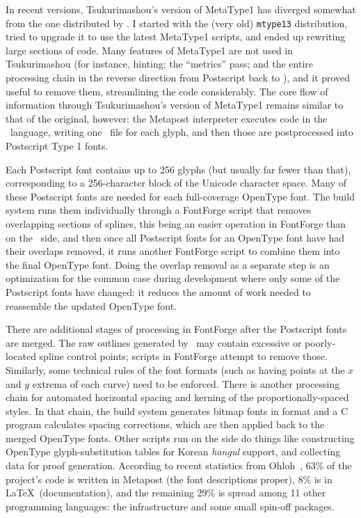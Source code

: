 \documentclass{ltugboat}
\begin{document}
In recent versions, Tsukurimashou's version of MetaType1 has diverged
somewhat from the one distributed by .  I started with the (very
old) \texttt{mtype13} distribution, tried to upgrade it to use the latest
MetaType1 scripts, and ended up rewriting large sections of code.  Many
features of MetaType1 are not used in Tsukurimashou (for instance, hinting;
the ``metrics'' pass; and the entire processing chain in the reverse
direction from Postscript back to \MF), and it proved useful to remove them,
streamlining the code considerably.  The core flow of information through
Tsukurimashou's version of MetaType1 remains similar to that of the
original, however: the Metapost interpreter executes code in the \MF\
language, writing one \EPS\ file for each glyph, and then those are
postprocessed into Postscript Type 1 fonts.

Each Postscript font contains up to 256 glyphs (but usually far fewer than
that), corresponding to a 256-character block of the Unicode character
space.  Many of these Postscript fonts are needed for each full-coverage
OpenType font.  The build system runs them individually through a FontForge
script that removes overlapping sections of splines, this being an easier
operation in FontForge than on the \MF\ side, and then once all Postscript
fonts for an OpenType font have had their overlaps removed, it runs another
FontForge script to combine them into the final OpenType font.  Doing the
overlap removal as a separate step is an optimization for the common case
during development where only some of the Postscript fonts have changed: it
reduces the amount of work needed to reassemble the updated OpenType font.

There are additional stages of processing in FontForge after the Postscript
fonts are merged.  The raw outlines generated by \MF\ may contain excessive
or poorly-located spline control points; scripts in FontForge attempt to
remove those.  Similarly, some technical rules of the font formats (such as
having points at the $x$ and $y$ extrema of each curve) need to be enforced. 
There is another processing chain for automated horizontal spacing and
kerning of the proportionally-spaced styles.  In that chain, the build
system generates bitmap fonts in \acro{BDF} format and a C program
calculates spacing corrections, which are then applied back to the merged
OpenType fonts.  Other scripts run on the side do things like constructing
OpenType glyph-substitution tables for Korean \emph{hangul} support, and
collecting data for proof generation.  According to recent statistics from
Ohloh~\cite{Ohloh:Languages}, 63\% of the project's code is written in
Metapost (the font descriptions proper), 8\% is in \LaTeX\ (documentation),
and the remaining 29\% is spread among 11 other programming languages: the
infrastructure and some small spin-off packages.
\end{document}
